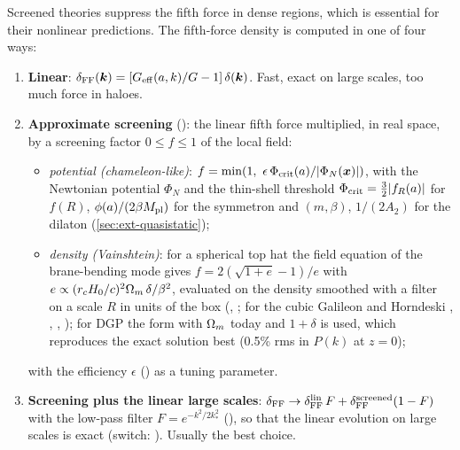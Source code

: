 Screened theories suppress the fifth force in dense regions, which is essential for their nonlinear predictions. The
fifth-force density is computed in one of four ways:
\begin{enumerate}
\item \textbf{Linear}: $\delta_{\rm FF}(\bm{k})=\left[G_{\rm eff}(a,k)/G-1\right]\delta(\bm{k})$. Fast, exact on large scales,
      too much force in haloes.
\item \textbf{Approximate screening} \cite{WintherFerreira2014,Brando2023} (): the
      linear fifth force multiplied, in real space, by a screening factor $0\le f\le1$ of the local field:
      \begin{itemize}
      \item \emph{potential (chameleon-like)}: $f=\min\!\left(1,\ \epsilon\,\Phi_{\rm crit}(a)/|\Phi_N(\bm{x})|\right)$, with
            the Newtonian potential $\Phi_N$ and the thin-shell threshold $\Phi_{\rm crit}=\frac32|f_R(a)|$ for $f(R)$,
            $\phi(a)/(2\beta M_{\rm pl})$ for the symmetron and $(m,\beta)$, $1/(2A_2)$ for the dilaton (\cref{sec:ext-quasistatic});
      \item \emph{density (Vainshtein)}: for a spherical top hat the field equation of the brane-bending mode gives
            $f=2(\sqrt{1+e}-1)/e$ with $e\propto(r_cH_0/c)^2\Omega_m\,\delta/\beta^2$, evaluated on the density smoothed with a
            filter on a scale $R$ in units of the box (,
            ; for the cubic Galileon and Horndeski
            , ,
            , );
            for DGP the
            form with $\Omega_m$ today and $1+\delta$ is used, which reproduces the exact solution best (0.5\% rms in $P(k)$
            at $z=0$);
      \end{itemize}
      with the efficiency $\epsilon$ () as a tuning parameter.
\item \textbf{Screening plus the linear large scales}:
      $\delta_{\rm FF}\to\delta_{\rm FF}^{\rm lin}\,F+\delta_{\rm FF}^{\rm screened}(1-F)$ with the low-pass filter
      $F=e^{-k^2/2k_*^2}$ (), so that the linear evolution on large
      scales is exact (switch: ). Usually the best choice.

\end{enumerate}
